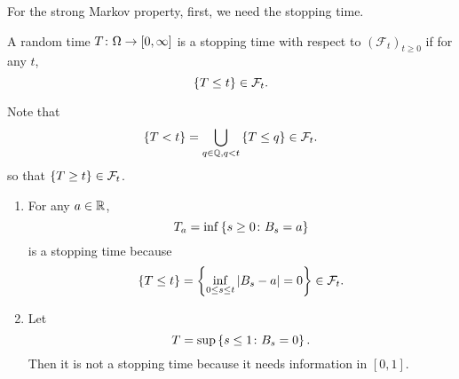 \noindent For the strong Markov property, first, we need the stopping time.
\begin{defn}
    A random time $T \colon \Omega \rightarrow [0,\infty]$ is a stopping time with respect to $(\mathcal{F}_t)_{t \geq 0}$ if for any $t$,
    \begin{equation*}
        \left\{T \leq t\right\} \in \mathcal{F}_t.
    \end{equation*}
\end{defn}
\begin{rmk}
    Note that
    \begin{equation*}
        \left\{T < t\right\} = \bigcup_{q \in \mathbb{Q},q < t} \left\{T \leq q\right\} \in \mathcal{F}_t.
    \end{equation*}
    so that $\left\{T \geq t\right\} \in \mathcal{F}_t$.
\end{rmk}

\begin{exam}
    \begin{enumerate}[label=(\arabic{*})]
        \item For any $a \in \mathbb{R}$,
        \begin{equation*}
            T_a = \inf \left\{s \geq 0 \colon B_s = a\right\}
        \end{equation*}
        is a stopping time because
        \begin{equation*}
            \left\{T \leq t\right\} = \left\{ \inf_{0\leq s\leq t} \left\lvert B_s - a\right\lvert = 0 \right\} \in \mathcal{F}_t.
        \end{equation*}

        \item Let
        \begin{equation*}
            T = \sup \left\{s \leq 1 \colon B_s = 0\right\}.
        \end{equation*}
        Then it is not a stopping time because it needs information in $[0,1]$.
    \end{enumerate}
\end{exam}

